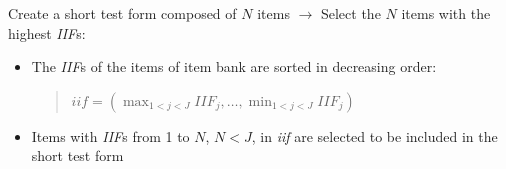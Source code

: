 \documentclass[aspectratio=149, compress]{beamer}
\begin{document}
\begin{frame}
	
		Create a short test form composed of $N$ items \color{template} $\rightarrow$ \normalcolor Select the $N$ items with the highest \emph{IIF}s: 
	
	\vspace{2mm}
	\begin{itemize}
		\item 	The \emph{IIF}s of the items of item bank are sorted in decreasing order: 
		
		\vspace{2mm}
		\begin{quote}
			$\mathit{iif} = (\displaystyle \max_{1 < j < J} IIF_j, \ldots \displaystyle, \min_{1 < j < J} IIF_j) $
		\end{quote}
		
		\vspace{2mm}
		\item 	Items with \emph{IIF}s from 1 to $N$, $N < J$, in \emph{iif} are selected to be included in the short test form
	\end{itemize}
\end{frame}
\end{document}
